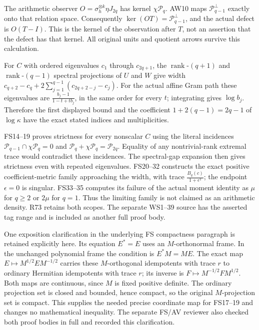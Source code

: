The arithmetic observer \(O=\sigma_h^{\otimes k}\eta J_{2q}\) has kernel
\(\chi\mathcal P_q\). AW10 maps \(\mathcal P_{q-1}^{\perp}\) exactly
onto that relation space. Consequently
\(\ker(OT)=\mathcal P_{q-1}^{\perp}\), and the actual defect is
\(O(T-I)\). This is the kernel of the observation after \(T\), not an
assertion that the defect has that kernel. All original units and
quotient arrows survive this calculation.

For \(C\) with ordered eigenvalues \(c_1\) through \(c_{2q+1}\), the
\(\operatorname{rank}\text{-}(q+1)\) and
\(\operatorname{rank}\text{-}(q-1)\) spectral projections of \(U\) and
\(W\) give width \(c_{q+2}-c_q+2\sum_{j=1}^{q-1}(c_{2q+2-j}-c_j)\). For
the actual affine Gram path these eigenvalues are
\(\frac{b_j-1}{1-t+tb_j}\), in the same order for every \(t\);
integrating gives \(\log b_j\). Therefore the first displayed bound and
the coefficient \(1+2(q-1)=2q-1\) of \(\log\kappa\) have the exact
stated indices and multiplicities.

FS14--19 proves strictness for every nonscalar \(C\) using the literal
incidences \(\mathcal P_{q-1}\cap\chi\mathcal P_q=0\) and
\(\mathcal P_q+\chi\mathcal P_q=\mathcal P_{2q}\). Equality of any
nontrivial-rank extremal trace would contradict these incidences. The
spectral-gap expansion then gives strictness even with repeated
eigenvalues. FS20--32 constructs the exact positive coefficient-metric
family approaching the width, with trace
\(\frac{B_q(c)}{1+\epsilon^2}\); the endpoint \(\epsilon=0\) is
singular. FS33--35 computes its failure of the actual moment identity as
\(\mu\) for \(q\geq2\) or \(2\mu\) for \(q=1\). Thus the limiting family
is not claimed as an arithmetic density. R73 retains both scopes. The
separate WS1--39 source has the asserted tag range and is included as
another full proof body.

One exposition clarification in the underlying FS compactness paragraph
is retained explicitly here. Its equation \(E^*=E\) uses an
\(M\)-orthonormal frame. In the unchanged polynomial frame the condition
is \(E^*M=ME\). The exact map \(E\mapsto M^{1/2}EM^{-1/2}\) carries
these \(M\)-orthogonal idempotents with trace \(r\) to ordinary
Hermitian idempotents with trace \(r\); its inverse is
\(F\mapsto M^{-1/2}FM^{1/2}\). Both maps are continuous, since \(M\) is
fixed positive definite. The ordinary projection set is closed and
bounded, hence compact, so the original \(M\)-projection set is compact.
This supplies the needed precise coordinate map for FS17--19 and changes
no mathematical inequality. The separate FS/AV reviewer also checked
both proof bodies in full and recorded this clarification.

